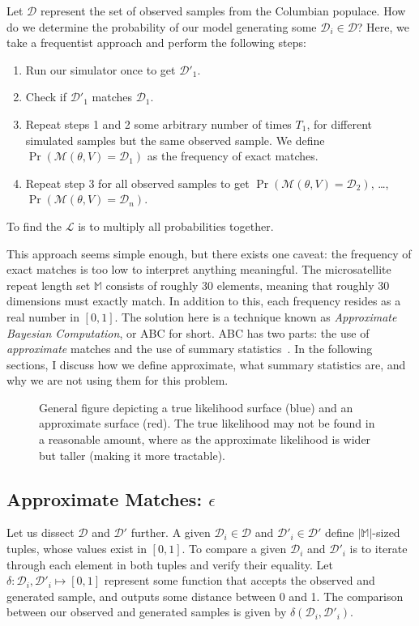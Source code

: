 Let $\mathcal{D}$ represent the set of observed samples from the Columbian populace.
How do we determine the probability of our model generating some $\mathcal{D}_i \in \mathcal{D}$?
Here, we take a frequentist approach and perform the following steps:
\begin{enumerate}
    \item Run our simulator once to get $\mathcal{D}'_1$.
    \item Check if $\mathcal{D}'_1$ matches $\mathcal{D}_1$.
    \item Repeat steps 1 and 2 some arbitrary number of times $T_1$, for different simulated samples but the same
        observed sample.
        We define $\Pr\left( \mathcal{M}(\theta, V) = \mathcal{D}_1 \right)$ as the frequency of exact matches.
    \item Repeat step 3 for all observed samples to get $\Pr\left( \mathcal{M}(\theta, V) = \mathcal{D}_2 \right)$,
        \ldots, $\Pr\left( \mathcal{M}(\theta, V) = \mathcal{D}_n \right)$.
\end{enumerate}
To find the $\mathcal{L}$ is to multiply all probabilities together.

This approach seems simple enough, but there exists one caveat: the frequency of exact matches is too low to interpret
anything meaningful.
The microsatellite repeat length set $\mathbb{M}$ consists of roughly 30 elements, meaning that roughly 30 dimensions
must exactly match.
In addition to this, each frequency resides as a real number in $[0, 1]$.
The solution here is a technique known as \emph{Approximate Bayesian Computation}, or ABC for short.
ABC has two parts: the use of \emph{approximate} matches and the use of summary
statistics~\cite{lintusaariFundamentalsRecentDevelopments2017}.
In the following sections, I discuss how we define approximate, what summary statistics are, and why we are not using
them for this problem.

\begin{figure}[t]
    \centering{}
    \caption{General figure depicting a true likelihood surface (blue) and an approximate surface (red).
    The true likelihood may not be found in a reasonable amount, where as the approximate likelihood is wider but
    taller (making it more tractable).
    }\label{fig:approximateLikelihood}
\end{figure}

\subsection{Approximate Matches: $\epsilon$}\label{subsec:approximateMatches}
Let us dissect $\mathcal{D}$ and $\mathcal{D}'$ further.
A given $\mathcal{D}_i \in \mathcal{D}$ and $\mathcal{D}'_i \in \mathcal{D}'$ define $| \mathbb{M} |$-sized tuples,
whose values exist in $[0, 1]$.
To compare a given $\mathcal{D}_i$ and $\mathcal{D}'_i$ is to iterate through each element in both tuples and verify
their equality.
Let $\delta : \mathcal{D}_i,\mathcal{D}'_i \mapsto [0, 1]$ represent some function that accepts the observed and
generated sample, and outputs some distance between 0 and 1.
The comparison between our observed and generated samples is given by $\delta(\mathcal{D}_i, \mathcal{D}'_i)$.

